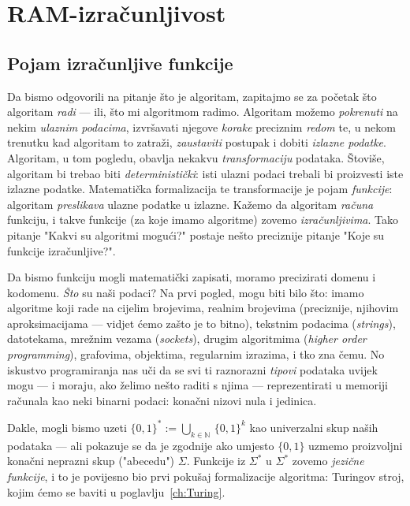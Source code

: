 \chapter{RAM-izračunljivost}

\section{Pojam izračunljive funkcije}

Da bismo odgovorili na pitanje što je algoritam, zapitajmo se za početak što algoritam \emph{radi}  --- ili, što mi algoritmom radimo. Algoritam možemo \emph{pokrenuti} na nekim \emph{ulaznim podacima}, izvršavati njegove \emph{korake} preciznim \emph{redom} te, u nekom trenutku kad algoritam to zatraži, \emph{zaustaviti} postupak i dobiti \emph{izlazne podatke}. Algoritam, u tom pogledu, obavlja nekakvu \emph{transformaciju} podataka. Štoviše, algoritam bi trebao biti \emph{deterministički}: isti ulazni podaci trebali bi proizvesti iste izlazne podatke. Matematička formalizacija te transformacije je pojam \emph{funkcije}: algoritam \emph{preslikava} ulazne podatke u izlazne. Kažemo da algoritam \emph{računa} funkciju, i takve funkcije (za koje imamo algoritme) zovemo \emph{izračunljivima}. Tako pitanje "Kakvi su algoritmi mogući?" postaje nešto preciznije pitanje "Koje su funkcije izračunljive?".


Da bismo funkciju mogli matematički zapisati, moramo precizirati domenu i kodomenu. \emph{Što} su naši podaci?
Na prvi pogled, mogu biti bilo što: imamo algoritme koji rade na cijelim brojevima, realnim brojevima (preciznije, njihovim aproksimacijama --- vidjet ćemo zašto je to bitno), tekstnim podacima (\emph{strings}), datotekama, mrežnim vezama (\emph{sockets}), drugim algoritmima (\emph{higher order programming}), grafovima, objektima, regularnim izrazima, i tko zna čemu. No iskustvo programiranja nas uči da se svi ti raznorazni \emph{tipovi} podataka uvijek mogu --- i moraju, ako želimo nešto raditi s njima --- reprezentirati u memoriji računala kao neki binarni podaci: konačni nizovi nula i jedinica.

Dakle, mogli bismo uzeti $\{0,1\}^*:=\bigcup_{k\in\mathbb N}\,\{0,1\}^k$ kao univerzalni skup naših podataka --- ali pokazuje se da je zgodnije ako umjesto $\{0,1\}$ uzmemo proizvoljni konačni neprazni skup ("abecedu") $\Sigma$. Funkcije iz $\Sigma^*$ u $\Sigma^*$ zovemo \emph{jezične funkcije}, i to je povijesno bio prvi pokušaj formalizacije algoritma: Turingov stroj, kojim ćemo se baviti u poglavlju~\ref{ch:Turing}.

